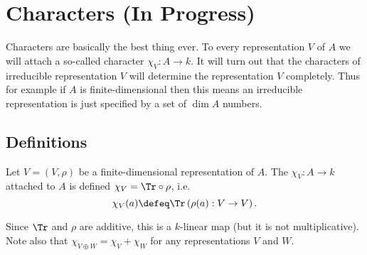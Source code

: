\chapter{Characters (In Progress)}
Characters are basically the best thing ever.
To every representation $V$ of $A$ we will attach a
so-called character $\chi_V : A \to k$.
It will turn out that the characters of irreducible representation $V$
will determine the representation $V$ completely.
Thus for example if $A$ is finite-dimensional then this means an
irreducible representation is just specified by a set of $\dim A$ numbers.

\section{Definitions}
\begin{definition}
	Let $V = (V, \rho)$ be a finite-dimensional representation of $A$.
	The  $\chi_V : A \to k$ attached to
	$A$ is defined $\chi_V = \Tr \circ \rho$, i.e.\
	\[ \chi_V(a) \defeq \Tr\left( \rho(a) : V \to V \right). \]
\end{definition}
Since $\Tr$ and $\rho$ are additive, this is a $k$-linear map
(but it is not multiplicative).
Note also that $\chi_{V \oplus W} = \chi_V + \chi_W$
for any representations $V$ and $W$.

